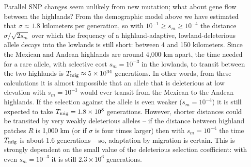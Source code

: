 {{{%

Parallel SNP changes seem unlikely from new mutation; 
what about gene flow between the highlands?
From the demographic model above
we have estimated that $\sigma \approx 1.8$ kilometers per generation,
so with $10^{-1} \ge s_m \ge 10^{-4}$ the distance $\sigma/\sqrt{2s_m}$ over which the frequency of 
a highland-adaptive, lowland-deleterious allele decays into the lowlands
is still short: between 4 and 150 kilometers.
Since the Mexican and Andean highlands are around 4,000 km apart,
the time needed for a rare allele, with selective cost $s_m=10^{-3}$ in the lowlands, to transit between the two highlands
is $T_{\text{mig}} \approx 5 \times 10^{34}$ generations.
In other words, from these calculations it is almost impossible that an allele that is deleterious at low elevation with $s_m=10^{-3}$ 
would ever transit from the Mexican to the Andean highlands.
If the selection against the allele is even weaker ($s_m=10^{-4}$) it is still expected to take $T_{\text{mig}} = 1.8 \times 10^8$ generations.
However, shorter distances could be transited by very weakly deleterious alleles --
if the distance between highland patches $R$ is 1,000 km (or if $\sigma$ is four times larger)
then with $s_m=10^{-4}$ the time $T_{\text{mig}}$ is about 1.6 generations --
so, adaptation by migration is certain.
This is strongly dependent on the small value of the deleterious selection coefficient: 
with even $s_m=10^{-3}$ it is still $2.3 \times 10^6$ generations.

}}}

